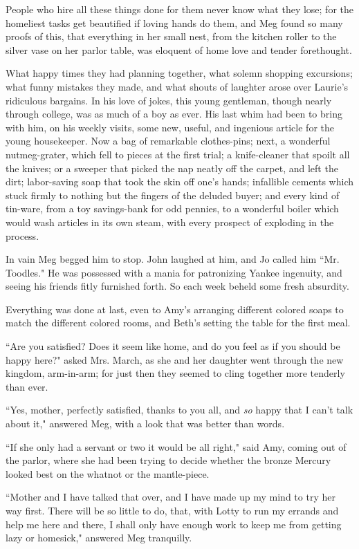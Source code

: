 People who hire all these things done for them never know what they
lose; for the homeliest tasks get beautified if loving hands do them,
and Meg found so many proofs of this, that everything in her small nest,
from the kitchen roller to the silver vase on her parlor table, was
eloquent of home love and tender forethought.

What happy times they had planning together, what solemn shopping
excursions; what funny mistakes they made, and what shouts of laughter
arose over Laurie's ridiculous bargains. In his love of
jokes, this young gentleman, though nearly through college, was as much
of a boy as ever. His last whim had been to bring with him, on his
weekly visits, some new, useful, and ingenious article for the young
housekeeper. Now a bag of remarkable clothes-pins; next, a wonderful
nutmeg-grater, which fell to pieces at the first trial; a knife-cleaner
that spoilt all the knives; or a sweeper that picked the nap neatly off
the carpet, and left the dirt; labor-saving soap that took the skin off
one's hands; infallible cements which stuck firmly to
nothing but the fingers of the deluded buyer; and every kind of
tin-ware, from a toy savings-bank for odd pennies, to a wonderful boiler
which would wash articles in its own steam, with every prospect of
exploding in the process.

In vain Meg begged him to stop. John laughed at him, and Jo called him
``Mr. Toodles." He was possessed with a mania for patronizing Yankee
ingenuity, and seeing his friends fitly furnished forth. So each week
beheld some fresh absurdity.

Everything was done at last, even to Amy's arranging
different colored soaps to match the different colored rooms, and
Beth's setting the table for the first meal.

``Are you satisfied? Does it seem like home, and do you feel as if you
should be happy here?" asked Mrs. March, as she and her daughter went
through the new kingdom, arm-in-arm; for just then they seemed to cling
together more tenderly than ever.

``Yes, mother, perfectly satisfied, thanks to you all, and \emph{so}
happy that I can't talk about it," answered Meg, with a
look that was better than words.

``If she only had a servant or two it would be all right," said Amy,
coming out of the parlor, where she had been trying to decide whether
the bronze Mercury looked best on the whatnot or the mantle-piece.

``Mother and I have talked that over, and I have made up my mind to try
her way first. There will be so little to do, that, with Lotty to run my
errands and help me here and there, I shall only have enough work to
keep me from getting lazy or homesick," answered Meg tranquilly.

